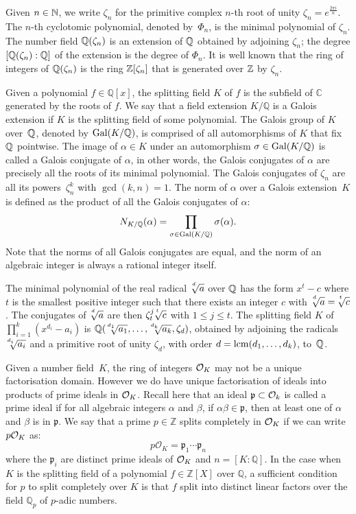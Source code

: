 Given $n\in \mathbb{N}$, we write $\zeta_n$ for the primitive complex $n$-th root of unity $\zeta_n = e^{\frac{2\pi i}{n}}$.
The $n$-th cyclotomic polynomial, denoted by~$\Phi_n$, is the minimal polynomial of $\zeta_n$. 
The number field $\mathbb{Q}(\zeta_n)$ is an extension of $\mathbb{Q}$ obtained by adjoining $\zeta_n$; the degree $[\mathbb{Q}(\zeta_n):\mathbb{Q}]$ of the extension is the degree of $\Phi_n$. It is well known that the ring of  integers of $\mathbb{Q}(\zeta_n)$ is the ring $\mathbb{Z}[\zeta_n]$
that is generated over $\mathbb{Z}$ by $\zeta_n$.

Given a polynomial $f\in \mathbb{Q}[x]$, the splitting field 
$K$ of $f$ is the subfield of $\mathbb{C}$ generated by 
the roots of $f$.  We say that a field extension $K/\mathbb{Q}$ is a Galois extension if $K$ is the splitting field of some 
polynomial.  
The Galois group of $K$ over~$\mathbb{Q}$, denoted by $\operatorname{Gal}(K/\mathbb{Q})$, is comprised of all automorphisms of $K$ that fix $\mathbb{Q}$ pointwise. The image of $\alpha \in K$ under an automorphism  $\sigma\in \operatorname{Gal}(K/\mathbb{Q})$ is
called a Galois conjugate of $\alpha$, in other words, the Galois conjugates of $\alpha$ are precisely all the roots of its minimal polynomial. 
The Galois conjugates of $\zeta_n$ are all its powers~$\zeta^k_n$ with $\gcd(k,n)=1$. 
The norm of $\alpha$ over a Galois extension~$K$ is defined as the product of all the Galois conjugates of $\alpha$:
\[N_{K/\mathbb{Q}}(\alpha)=\prod_{\sigma\in \operatorname{Gal}(K/\mathbb{Q})}\sigma(\alpha).\]
Note that the norms of all Galois conjugates are equal,
and the norm of an algebraic integer is always a rational integer itself. 

The minimal polynomial of the real radical $\mysqrt{d}{a}$ over $\mathbb{Q}$ has the form
$x^{t}-c$ where $t$ is the smallest positive integer such that there exists an integer $c$ with $\mysqrt{d}{a}=\mysqrt{t}{c}$.
The conjugates of $\mysqrt{d}{a}$ are then $\zeta^j_t\mysqrt{t}{c}$ with $1\leq j \leq t$.
The splitting field $K$ of
$\prod_{i=1}^k (x^{d_i}-a_i)$ is $\QQ(\mysqrt{d_1}{a_1}, \ldots, \mysqrt{d_k}{a_k},\zeta_d)$,  obtained by adjoining the radicals $\mysqrt{d_i}{a_i}$ and  a primitive root of unity $\zeta_d$, with order $d=\operatorname{lcm}(d_1,\ldots,d_k)$, to~$\mathbb{Q}$. 


Given a number field~$K$,
the ring of integers $\mathcal{O}_K$ may not be a unique factorisation domain. However we do have unique factorisation of ideals 
into products of prime ideals in $\mathcal{O}_K$.  Recall here that an
ideal $\mathfrak{p} \subset \mathcal{O}_k$ is called a prime ideal if for all algebraic integers $\alpha$ and $\beta$, if $\alpha\beta \in \mathfrak{p}$, then at least one of $\alpha$ and $\beta$ is in $\mathfrak{p}$. 
We say that a prime $p\in \mathbb{Z}$ splits completely in
$\mathcal{O}_K$ 
if we can write $p\mathcal{O}_K$ as:
\[ p\mathcal{O}_K = \mathfrak{p}_1 \cdots \mathfrak{p}_n \]
where the $\mathfrak{p}_i$ are distinct prime ideals of $\mathcal{O}_K$ and $n = [K:\mathbb{Q}]$.
In the case when $K$ is the splitting field of a polynomial $f \in \mathbb{Z}[X]$
over $\mathbb{Q}$, a sufficient condition for $p$ to split completely 
over $K$ is that $f$ split into distinct linear factors over the field 
$\mathbb{Q}_p$ of $p$-adic numbers.



